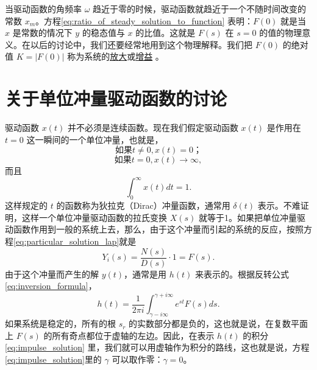 当驱动函数的角频率 $\omega$ 趋近于零的时候，驱动函数就趋近于一个不随时间改变的常数 $x_m$。方程\eqref{eq:ratio_of_steady_solution_to_function} 表明：$F(0)$ 就是当 $x$ 是常数的情况下 $y$ 的稳态值与 $x$ 的比值。这就是 $F(s)$ 在 $s=0$ 的值的物理意义。在以后的讨论中，我们还要经常地用到这个物理解释。我们把 $F(0)$ 的绝对值 $K = |F(0)|$ 称为系统的\underline{放大}或\underline{增益} 。

\section{关于单位冲量驱动函数的讨论}\label{sec:ch2_section5}

驱动函数 $x(t)$ 并不必须是连续函数。现在我们假定驱动函数 $x(t)$ 是作用在 $t=0$ 这一瞬间的一个单位冲量，也就是，
\begin{equation*}
\mbox{如果} t \neq 0, x(t) = 0；
\end{equation*}
\begin{equation*}
\mbox{如果} t = 0, x(t) \to \infty,
\end{equation*}
而且
\begin{equation*}
\int_{0}^{\infty} x(t) dt = 1.
\end{equation*}
这样规定的 $t$ 的函数称为狄拉克（Dirac）冲量函数，通常用 $\delta(t)$ 表示。不难证明，这样一个单位冲量驱动函数的拉氏变换 $X(s)$ 就等于1。如果把单位冲量驱动函数作用到一般的系统上去，那么，由于这个冲量而引起的系统的反应，按照方程\eqref{eq:particular_solution_lap}就是
\begin{equation}
Y_i(s) = \frac{N(s)}{D(s)} \cdot 1 = F(s).
\end{equation}
由于这个冲量而产生的解 $y(t)$，通常是用 $h(t)$ 来表示的。根据反转公式\eqref{eq:inversion_formula}，
\begin{equation}\label{eq:impulse_solution}
h(t) = \frac{1}{2\pi i} \int_{\gamma-i\infty}^{\gamma+i\infty} e^{st}F(s)ds.
\end{equation}
如果系统是稳定的，所有的根 $s_r$ 的实数部分都是负的，这也就是说，在复数平面上 $F(s)$ 的所有奇点都位于虚轴的左边。因此，在表示 $h(t)$ 的积分\eqref{eq:impulse_solution} 里，我们就可以用虚轴作为积分的路线，这也就是说，方程\eqref{eq:impulse_solution}里的 $\gamma$ 可以取作零：$\gamma = 0$。
